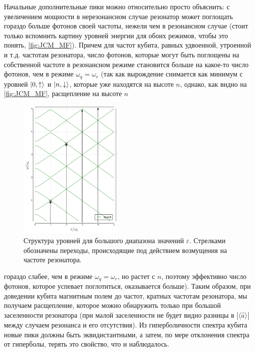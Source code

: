 \documentclass[12pt, twoside]{report}
\DeclarePairedDelimiter\ket{\lvert}{\rangle}
\numberwithin{equation}{section}
\numberwithin{figure}{section}
\begin{document}
Начальные дополнительные пики можно относительно просто объяснить: с увеличением мощности в нерезонансном случае резонатор может поглощать гораздо больше фотонов своей частоты, нежели чем в резонансном случае (стоит только вспомнить картину уровней энергии для обоих режимов, чтобы это понять, \autoref{fig:JCM_MF}). 
Причем для частот кубита, равных удвоенной, утроенной и т.д. частотам резонатора, число фотонов, которые могут быть поглощены на собственной частоте в резонансном режиме становится больше на какое-то число фотонов, чем в режиме $\omega_q = \omega_r$ (так как вырождение снимается как минимум с уровней $\ket{0, \uparrow}$ и $\ket{n, \downarrow}$, которые уже находятся на высоте $n$, однако, как видно на \autoref{fig:JCM_MF}, расщепление на высоте $n$
\begin{figure}
\begingroup
\captionsetup{justification=normal, width=0.45\textwidth}
\includegraphics[width=0.45\textwidth]{Pictures/JCM_MF}
\caption{Структура уровней для большого диапазона значений $\varepsilon$. Стрелками обозначены переходы, происходящие под действием возмущения на частоте резонатора.}
\label{fig:JCM_MF}
\endgroup
\end{figure}
 гораздо слабее, чем в режиме $\omega_q = \omega_r$, но растет с $n$, поэтому эффективно число фотонов, которое успевает поглотиться, оказывается больше). 
Таким образом, при доведении кубита магнитным полем до частот, кратных частотам резонатора, мы получаем расщепление, которое можно обнаружить только при большой заселенности резонатора (при малой заселенности не будет видно разницы в $|\langle \hat a \rangle|$ между случаем резонанса и его отсутствия). Из гиперболичности спектра кубита новые пики должны быть эквидистантными, а затем, по мере отклонения спектра от гиперболы, терять это свойство, что и наблюдалось. 
\end{document}
